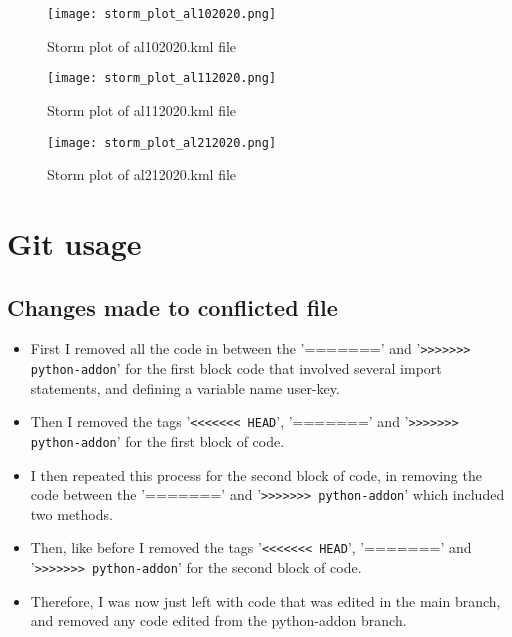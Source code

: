 \documentclass[]{article} %
\begin{document}
\begin{figure}[htbp]
    \centering
    \texttt{[image: storm\_plot\_al102020.png]}
    \caption{Storm plot of al102020.kml file}
    \label{fig:hurricane-visualization-one}
\end{figure}

\begin{figure}[htbp]
    \centering
    \texttt{[image: storm\_plot\_al112020.png]}
    \caption{Storm plot of al112020.kml file}
    \label{fig:hurricane-visualization-two}
\end{figure}

\begin{figure}[htbp]
    \centering
    \texttt{[image: storm\_plot\_al212020.png]}
    \caption{Storm plot of al212020.kml file}
    \label{fig:hurricane-visualization-three}
\end{figure}
\clearpage
\section{Git usage\\} %
\subsection{Changes made to conflicted file}
\begin{itemize}
    \item First I removed all the code in between the '=======' and '\verb|>>>>>>> python-addon|' for the first block code that involved several import statements, and defining a variable name user-key.
    \item Then I removed the tags '\verb|<<<<<<< HEAD|', '=======' and '\verb|>>>>>>> python-addon|' for the first block of code.
    \item I then repeated this process for the second block of code, in removing the code between the '=======' and '\verb|>>>>>>> python-addon|' which included two methods.
    \item Then, like before I removed the tags '\verb|<<<<<<< HEAD|', '=======' and '\verb|>>>>>>> python-addon|' for the second block of code.
    \item Therefore, I was now just left with code that was edited in the main branch, and removed any code edited from the python-addon branch. \\\\\\
\end{itemize}
\end{document}
